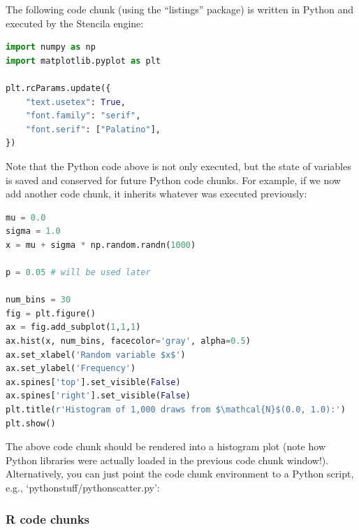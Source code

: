 \documentclass[12pt]{article}
\begin{document}
The following code chunk (using the ``listings'' package) is written
in Python and executed by the Stencila engine:\\

\begin{lstlisting}[language=Python, style=pythoncustomstyle-exec,
  caption={Customizing some aspects of plotting before it is actually
    done.}]
import numpy as np
import matplotlib.pyplot as plt

plt.rcParams.update({
    "text.usetex": True,
    "font.family": "serif",
    "font.serif": ["Palatino"],
})
\end{lstlisting}

Note that the Python code above is not only executed, but the state of
variables is saved and conserved for future Python code chunks.
For example, if we now add another code chunk, it inherits whatever
was executed previously:\\

\begin{lstlisting}[language=Python, style=pythoncustomstyle,
  caption={Histogram of 1,000 random draws from $\mathcal{N}$(0.0, 1.0).}]
mu = 0.0
sigma = 1.0
x = mu + sigma * np.random.randn(1000)

p = 0.05 # will be used later

num_bins = 30
fig = plt.figure()
ax = fig.add_subplot(1,1,1)
ax.hist(x, num_bins, facecolor='gray', alpha=0.5)
ax.set_xlabel('Random variable $x$')
ax.set_ylabel('Frequency')
ax.spines['top'].set_visible(False)
ax.spines['right'].set_visible(False)
plt.title(r'Histogram of 1,000 draws from $\mathcal{N}$(0.0, 1.0):')
plt.show()
\end{lstlisting}

The above code chunk should be rendered into a histogram plot (note
how Python libraries were actually loaded in the previous code chunk
window!).
Alternatively, you can just point the code chunk environment to a
Python script, e.g., `pythonstuff/pythonscatter.py':\\



\subsubsection*{R code chunks}
\end{document}
